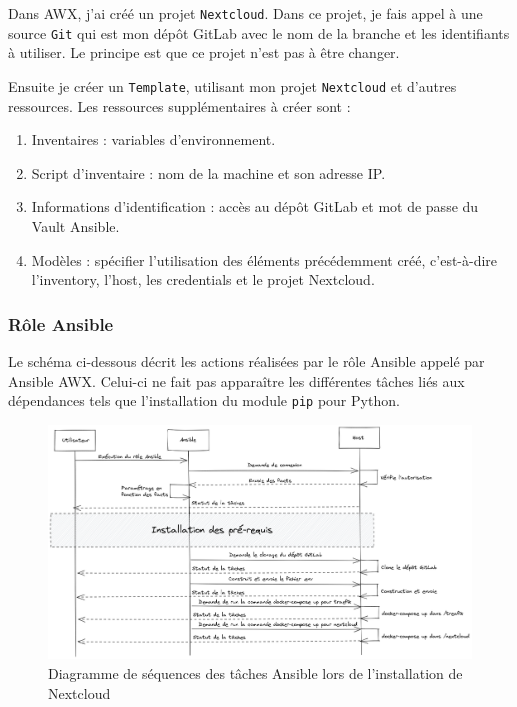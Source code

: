 \documentclass[12pt]{article}
\begin{document}
Dans AWX, j'ai créé un projet \verb|Nextcloud|. Dans ce projet, je fais appel à une source \verb|Git| qui est mon dépôt GitLab avec le nom de la branche et les identifiants à utiliser. Le principe est que ce projet n'est pas à être changer.

Ensuite je créer un \verb|Template|, utilisant mon projet \verb|Nextcloud| et d'autres ressources. Les ressources supplémentaires à créer sont :
\begin{enumerate}
    \item Inventaires : variables d'environnement. 
    \item Script d'inventaire : nom de la machine et son adresse IP.
    \item Informations d'identification : accès au dépôt GitLab et mot de passe du Vault Ansible.
    \item Modèles : spécifier l'utilisation des éléments précédemment créé, c'est-à-dire l'inventory, l'host, les credentials et le projet Nextcloud.
\end{enumerate}

\subsubsection{Rôle Ansible}
Le schéma ci-dessous décrit les actions réalisées par le rôle Ansible appelé par Ansible AWX. Celui-ci ne fait pas apparaître les différentes tâches liés aux dépendances tels que l'installation du module \verb|pip| pour Python.

\begin{figure}[!ht]
    \centering
    \includegraphics[width=\textwidth]{src/ansible_nextcloud.png}
    \caption{Diagramme de séquences des tâches Ansible lors de l'installation de Nextcloud}
    \label{fig:nextcloud_ansible}
\end{figure}
\end{document}
